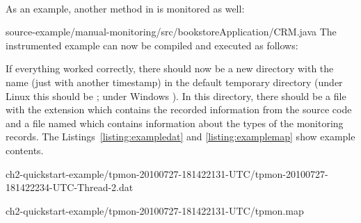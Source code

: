 \quad\\

\noindent As an example, another method in  is monitored as well:

\setJavaCodeListing
%
{source-example/manual-monitoring/src/bookstoreApplication/CRM.java}
The instrumented example can now be compiled and executed as follows:

\setBashListing 		
	




If everything worked correctly, there should now be a new directory with the %
name  (just with another timestamp) in the default %
temporary directory (under Linux this should be ; under Windows %
). In this directory, there should be a file with the extension %
 which contains the recorded information from the source code and %
a file named  which contains information about the types of the %
monitoring records. %
The Listings~\ref{listing:exampledat} and \ref{listing:examplemap} show example %
contents. 
\begin{figure}[H]
\begin{graybox}
\end{graybox}
\end{figure}

\setBashListing
%
{ch2-quickstart-example/tpmon-20100727-181422131-UTC/tpmon-20100727-181422234-UTC-Thread-2.dat}

%
{ch2-quickstart-example/tpmon-20100727-181422131-UTC/tpmon.map}

